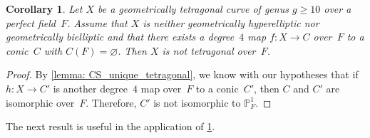 \documentclass[11pt,reqno]{amsart}
\renewcommand{\P}{\mathbb{P}}
\newtheorem{corollary}[theorem]{Corollary}
\theoremstyle{definition}
\begin{document}
\begin{corollary}\label{corollary: CS_not_tetragonal}
Let $X$ be a geometrically tetragonal curve of genus $g \geq 10$ over a perfect field~$F$. Assume that $X$ is neither geometrically hyperelliptic nor geometrically bielliptic and that there exists a degree~$4$ map $f \colon X \to C$ over~$F$ to a conic~$C$ with $C(F) = \varnothing$. Then $X$ is not tetragonal over~$F$. 
\end{corollary}
\begin{proof}
By \cref{lemma: CS_unique_tetragonal}, we know with our hypotheses that if $h \colon X \to C'$ is another degree~$4$ map over~$F$ to a conic~$C'$, then $C$ and $C'$ are isomorphic over~$F$. Therefore, $C'$ is not isomorphic to $\P^1_F$. 
\end{proof}


The next result is useful in the application of  \cref{corollary: CS_not_tetragonal}.
\end{document}
